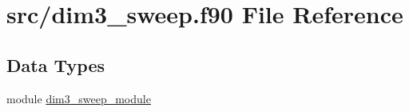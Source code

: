 \hypertarget{dim3__sweep_8f90}{\section{src/dim3\-\_\-sweep.f90 File Reference}
\label{dim3__sweep_8f90}
}
\subsection*{Data Types}
\begin{DoxyCompactItemize}
\item 
module \hyperlink{classdim3__sweep__module}{dim3\-\_\-sweep\-\_\-module}
\end{DoxyCompactItemize}

